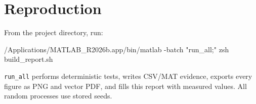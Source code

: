 \documentclass[
]{article}
\newenvironment{Shaded}{}{}
\newcommand{\AttributeTok}[1]{\textcolor[rgb]{0.49,0.56,0.16}{#1}}
\newcommand{\ExtensionTok}[1]{#1}
\newcommand{\FunctionTok}[1]{\textcolor[rgb]{0.02,0.16,0.49}{#1}}
\newcommand{\NormalTok}[1]{#1}
\newcommand{\StringTok}[1]{\textcolor[rgb]{0.25,0.44,0.63}{#1}}
\begin{document}
\section{Reproduction}\label{reproduction}

From the project directory, run:

\begin{Shaded}
\begin{Highlighting}[]
\ExtensionTok{/Applications/MATLAB\_R2026b.app/bin/matlab} \AttributeTok{{-}batch} \StringTok{"run\_all;"}
\FunctionTok{zsh}\NormalTok{ build\_report.sh}
\end{Highlighting}
\end{Shaded}

\texttt{run\_all} performs deterministic tests, writes CSV/MAT evidence,
exports every figure as PNG and vector PDF, and fills this report with
measured values. All random processes use stored seeds.
\end{document}
